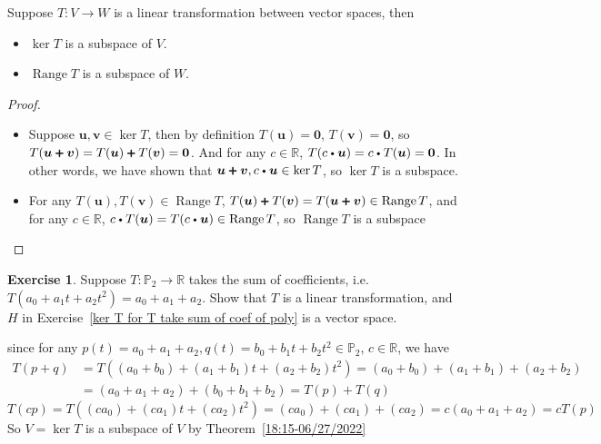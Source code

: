 \documentclass{beamer}
\newcommand{\fatdot}{\mathrel{\raisebox{0.25ex}{\tikz\filldraw[black,x=2pt,y=2pt] (0,0) circle (0.5);}}}
\newcommand{\fatplus}{\mathrel{\raisebox{-0.1ex}{\tikz\filldraw[black,x=2pt,y=2pt,scale=1.4] (0.9,0)--(1.1,0)--(1.1,0.9)--(2,0.9)--(2,1.1)--(1.1,1.1)--(1.1,2)--(0.9,2)--(0.9,1.1)--(0,1.1)--(0,0.9)--(0.9,0.9)--cycle;}}}
\DeclareMathOperator{\Range}{Range}
\theoremstyle{definition}
\newtheorem{exercise}[theorem]{Exercise}
\theoremstyle{remark}
\begin{document}
\begin{frame}[t]
\begin{theorem}\label{18:15-06/27/2022}
Suppose $T:V\to W$ is a linear transformation between vector spaces, then
\begin{itemize}
\item $\ker T$ is a subspace of $V$.
\item $\Range T$ is a subspace of $W$.
\end{itemize}
\end{theorem}
\pause
\begin{proof}
\hfill
\begin{itemize}
\item Suppose $\bm u,\bm v\in\ker T$, then by definition $T(\bm u)=\bm0$, $T(\bm v)=\bm0$, so $T(\bm u\fatplus\bm v)=T(\bm u)\fatplus T(\bm v)=\bm0$. And for any $c\in\mathbb R$, $T(c\fatdot\bm u)=c\fatdot T(\bm u)=\bm0$. In other words, we have shown that $\bm u\fatplus\bm v, c\fatdot\bm u\in \ker T$, so $\ker T$ is a subspace.
\item For any $T(\bm u),T(\bm v)\in\Range T$, $T(\bm u)\fatplus T(\bm v)=T(\bm u\fatplus\bm v)\in\Range T$, and for any $c\in\mathbb R$, $c\fatdot T(\bm u)=T(c\fatdot\bm u)\in\Range T$, so $\Range T$ is a subspace
\end{itemize}
\end{proof}
\end{frame}

\begin{frame}[t]
\begin{exercise}\label{17:52-06/29/2022}
Suppose $T:\mathbb P_2\to\mathbb R$ takes the sum of coefficients, i.e. $T(a_0+a_1t+a_2t^2)=a_0+a_1+a_2$. Show that $T$ is a linear transformation, and $H$ in Exercise~\ref{ker T for T take sum of coef of poly} is a vector space.
\end{exercise}
\pause
\begin{solution}
since for any $p(t)=a_0+a_1+a_2,q(t)=b_0+b_1t+b_2t^2\in\mathbb P_2$, $c\in\mathbb R$, we have
\begin{align*}
T(p+q)&=T((a_0+b_0)+(a_1+b_1)t+(a_2+b_2)t^2)=(a_0+b_0)+(a_1+b_1)+(a_2+b_2)\\
&=(a_0+a_1+a_2)+(b_0+b_1+b_2)=T(p)+T(q)
\end{align*}
\[
T(cp)=T((ca_0)+(ca_1)t+(ca_2)t^2)=(ca_0)+(ca_1)+(ca_2)=c(a_0+a_1+a_2)=cT(p)
\]
So $V=\ker T$ is a subspace of $V$ by Theorem~\ref{18:15-06/27/2022}
\end{solution}
\end{frame}
\end{document}

